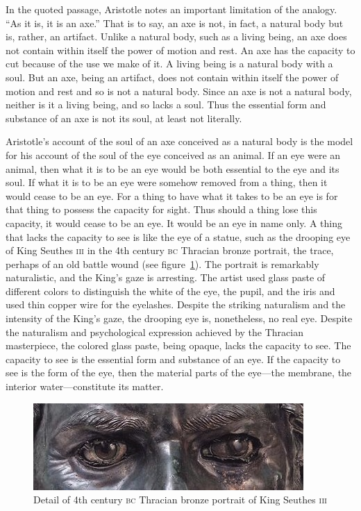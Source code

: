 In the quoted passage, Aristotle notes an important limitation of the analogy. ``As it is, it is an axe.'' That is to say, an axe is not, in fact, a natural body but is, rather, an artifact. Unlike a natural body, such as a living being, an axe does not contain within itself the power of motion and rest. An axe has the capacity to cut because of the use we make of it. A living being is a natural body with a soul. But an axe, being an artifact, does not contain within itself the power of motion and rest and so is not a natural body. Since an axe is not a natural body, neither is it a living being, and so lacks a soul. Thus the essential form and substance of an axe is not its soul, at least not literally.

Aristotle's account of the soul of an axe conceived as a natural body is the model for his account of the soul of the eye conceived as an animal. If an eye were an animal, then what it is to be an eye would be both essential to the eye and its soul. If what it is to be an eye were somehow removed from a thing, then it would cease to be an eye. For a thing to have what it takes to be an eye is for that thing to possess the capacity for sight. Thus should a thing lose this capacity, it would cease to be an eye. It would be an eye in name only. A thing that lacks the capacity to see is like the eye of a statue, such as the drooping eye of King Seuthes \textsc{iii} in the 4th century \textsc{bc} Thracian bronze portrait, the trace, perhaps of an old battle wound (see figure~\ref{fig:seuthesiii}). The portrait is remarkably naturalistic, and the King's gaze is arresting. The artist used glass paste of different colors to distinguish the white of the eye, the pupil, and the iris and used thin copper wire for the eyelashes. Despite the striking naturalism and the intensity of the King's gaze, the drooping eye is, nonetheless, no real eye. Despite the naturalism and psychological expression achieved by the Thracian masterpiece, the colored glass paste, being opaque, lacks the capacity to see. The capacity to see is the essential form and substance of an eye. If the capacity to see is the form of the eye, then the material parts of the eye---the membrane, the interior water---constitute its matter.

\begin{figure}[htbp]
	\centering
		\includegraphics[scale=1]{graphics/seuthesiii.jpg}
	\caption{Detail of 4th century \textsc{bc} Thracian bronze portrait of King Seuthes \textsc{iii}}
	\label{fig:seuthesiii}
\end{figure}


